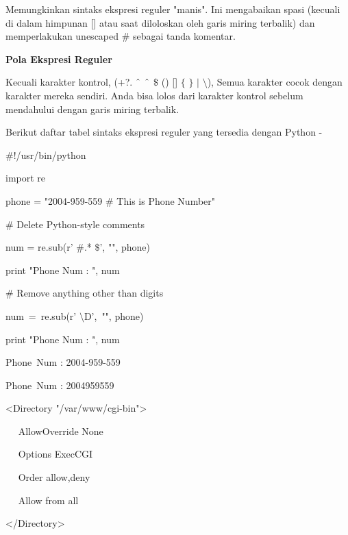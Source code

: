 \begin {enumerate}
\noindent 
Memungkinkan sintaks ekspresi reguler "manis". Ini mengabaikan spasi (kecuali di dalam himpunan [] atau saat diloloskan oleh garis miring terbalik) dan memperlakukan unescaped  $  \#  $ sebagai tanda komentar. \par
\vspace{12pt}
\noindent 
\textbf{Pola Ekspresi Reguler} \par
\vspace{12pt}
\noindent 
Kecuali karakter kontrol, (+?.  $  \string^  $  $  \string^  $  $  \$  $ () []  $  \{  $ $  \}  $  $  \vert  $  $  \setminus  $), Semua karakter cocok dengan karakter mereka sendiri. Anda bisa lolos dari karakter kontrol sebelum mendahului dengan garis miring terbalik. \par
\noindent 
Berikut daftar tabel sintaks ekspresi reguler yang tersedia dengan Python - \par
\noindent 
 $  \#  $!/usr/bin/python \par
\noindent 
import re \par
\vspace{12pt}
\noindent 
phone = "2004-959-559  $  \#  $ This is Phone Number" \par
\vspace{12pt}
\noindent 
 $  \#  $ Delete Python-style comments \par
\noindent 
num = re.sub(r' $  \#  $.* $  \$  $', "", phone) \par
\noindent 
print "Phone Num : ", num \par
\vspace{12pt}
\noindent 
 $  \#  $ Remove anything other than digits \par
\noindent 
num~=~re.sub(r' $  \setminus  $D',~"", phone)     \par
\noindent 
print "Phone Num : ", num \par
\vspace{12pt}
\noindent 
Phone~Num :  2004-959-559 \par
\noindent 
Phone~Num :  2004959559 \par
\vspace{12pt}
\noindent 
<Directory "/var/www/cgi-bin"> \par
\noindent 
~~ AllowOverride None \par
\noindent 
~~ Options ExecCGI \par
\noindent 
~~ Order allow,deny \par
\noindent 
~~ Allow from all \par
\noindent 
</Directory> \par

\end{enumerate}
